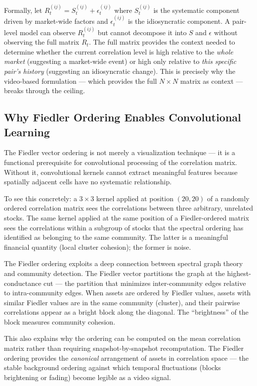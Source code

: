 \documentclass[runningheads]{llncs}
\begin{document}
Formally, let $R_t^{(ij)} = S_t^{(ij)} + \epsilon_t^{(ij)}$ where
$S_t^{(ij)}$ is the systematic component driven by market-wide factors
and $\epsilon_t^{(ij)}$ is the idiosyncratic component. A pair-level
model can observe $R_t^{(ij)}$ but cannot decompose it into $S$ and
$\epsilon$ without observing the full matrix $R_t$. The full matrix
provides the context needed to determine whether the current correlation
level is high relative to the \textit{whole market} (suggesting a
market-wide event) or high only relative to \textit{this specific pair's
history} (suggesting an idiosyncratic change). This is precisely why
the video-based formulation --- which provides the full $N \times N$
matrix as context --- breaks through the ceiling.

\subsection{Why Fiedler Ordering Enables Convolutional Learning}

The Fiedler vector ordering is not merely a visualization technique
--- it is a functional prerequisite for convolutional processing of
the correlation matrix. Without it, convolutional kernels cannot
extract meaningful features because spatially adjacent cells have no
systematic relationship.

To see this concretely: a $3\times3$ kernel applied at position
$(20, 20)$ of a randomly ordered correlation matrix sees the
correlations between three arbitrary, unrelated stocks. The same
kernel applied at the same position of a Fiedler-ordered matrix sees
the correlations within a subgroup of stocks that the spectral
ordering has identified as belonging to the same community. The latter
is a meaningful financial quantity (local cluster cohesion); the
former is noise.

The Fiedler ordering exploits a deep connection between spectral
graph theory and community detection. The Fiedler vector partitions
the graph at the highest-conductance cut --- the partition that
minimizes inter-community edges relative to intra-community edges.
When assets are ordered by Fiedler values, assets with similar Fiedler
values are in the same community (cluster), and their pairwise
correlations appear as a bright block along the diagonal. The
``brightness'' of the block measures community cohesion.

This also explains why the ordering can be computed on the mean
correlation matrix rather than requiring snapshot-by-snapshot
recomputation. The Fiedler ordering provides the \textit{canonical}
arrangement of assets in correlation space --- the stable background
ordering against which temporal fluctuations (blocks brightening or
fading) become legible as a video signal.
\end{document}
